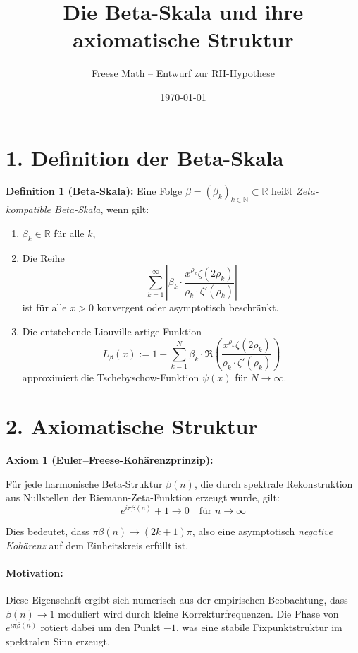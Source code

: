 \documentclass[a4paper,12pt]{article}
\title{Die Beta-Skala und ihre axiomatische Struktur}
\author{Freese Math – Entwurf zur RH-Hypothese}
\date{\today}
\begin{document}
\maketitle

\section*{1. Definition der Beta-Skala}

\textbf{Definition 1 (Beta-Skala):}
Eine Folge \( \beta = (\beta_k)_{k \in \mathbb{N}} \subset \mathbb{R} \) heißt \textit{Zeta-kompatible Beta-Skala}, wenn gilt:
\begin{enumerate}
    \item \( \beta_k \in \mathbb{R} \) für alle \( k \),
    \item Die Reihe
    \[
    \sum_{k=1}^\infty \left| \beta_k \cdot \frac{x^{\rho_k} \zeta(2\rho_k)}{\rho_k \cdot \zeta'(\rho_k)} \right|
    \]
    ist für alle \( x > 0 \) konvergent oder asymptotisch beschränkt.
    \item Die entstehende Liouville-artige Funktion
    \[
    L_\beta(x) := 1 + \sum_{k=1}^N \beta_k \cdot \Re\left( \frac{x^{\rho_k} \zeta(2\rho_k)}{\rho_k \cdot \zeta'(\rho_k)} \right)
    \]
    approximiert die Tschebyschow-Funktion \( \psi(x) \) für \( N \to \infty \).
\end{enumerate}

\bigskip

\section*{2. Axiomatische Struktur}

\textbf{Axiom 1 (Euler--Freese-Kohärenzprinzip):}

Für jede harmonische Beta-Struktur \( \beta(n) \), die durch spektrale Rekonstruktion aus Nullstellen der Riemann-Zeta-Funktion erzeugt wurde, gilt:
\[
\boxed{
e^{i\pi \beta(n)} + 1 \to 0 \quad \text{für } n \to \infty
}
\]

Dies bedeutet, dass \( \pi \beta(n) \to (2k+1)\pi \), also eine asymptotisch \textit{negative Kohärenz} auf dem Einheitskreis erfüllt ist.

\paragraph{Motivation:}  
Diese Eigenschaft ergibt sich numerisch aus der empirischen Beobachtung, dass \(\beta(n) \to 1\) moduliert wird durch kleine Korrekturfrequenzen. Die Phase von \( e^{i\pi\beta(n)} \) rotiert dabei um den Punkt \( -1 \), was eine stabile Fixpunktstruktur im spektralen Sinn erzeugt.
\end{document}
